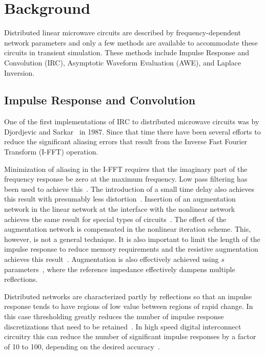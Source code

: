 \section{Background}

Distributed linear microwave circuits are described by
frequency-dependent network parameters and only a few methods are
available to accommodate these circuits in transient simulation. These
methods include Impulse Response and Convolution (IRC), Asymptotic Waveform
Evaluation (AWE), and Laplace Inversion.

\subsection{Impulse Response and Convolution}

One of the first implementations of IRC to distributed microwave
circuits was by Djordjevic and Sarkar~\cite{sarkar} in 1987.  Since
that time there have been several efforts to reduce the significant
aliasing errors that result from the Inverse Fast Fourier Transform
(I-FFT) operation.

Minimization of aliasing in the I-FFT requires that the imaginary part
of the frequency response be zero at the maximum frequency. Low pass
filtering has been used to achieve this~\cite{alpha}. The introduction
of a small time delay also achieves this result with presumably less
distortion~\cite{delta}. Insertion of an augmentation network in the
linear network at the interface with the nonlinear network achieves
the same result for special types of circuits~\cite{basel:paper}. The
effect of the augmentation network is compensated in the nonlinear
iteration scheme. This, however, is not a general technique. It is
also important to limit the length of the impulse response to reduce
memory requirements and the resistive augmentation achieves this
result~\cite{basel:paper}. Augmentation is also effectively achieved
using $s$ parameters~\cite{theta}, where the reference impedance
effectively dampens multiple reflections.

Distributed networks are characterized partly by reflections so that
an impulse response tends to have regions of low value between regions
of rapid change. In this case thresholding greatly reduces the number
of impulse response discretizations that need to be
retained~\cite{basel:paper}. In high speed digital interconnect
circuitry this can reduce the number of significant impulse responses
by a factor of 10 to 100, depending on the desired
accuracy~\cite{basel:paper}.

